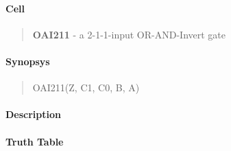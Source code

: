 \label{OAI211}
\paragraph{Cell}
\begin{quote}
    \textbf{OAI211} - a 2-1-1-input OR-AND-Invert gate
\end{quote}

\paragraph{Synopsys}
\begin{quote}
    OAI211(Z, C1, C0, B, A)
\end{quote}

\paragraph{Description}

%

\paragraph{Truth Table}


